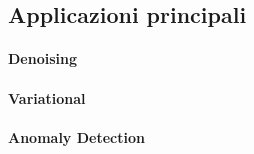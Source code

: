 %



\subsection{Applicazioni principali}

\paragraph{Denoising}

\paragraph{Variational}

\paragraph{Anomaly Detection}

%
%
%
%










